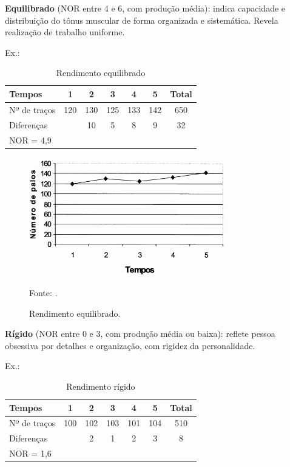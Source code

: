 \textbf{Equilibrado} (NOR entre 4 e 6, com produção média): indica capacidade e distribuição do tônus muscular de forma organizada e sistemática. Revela realização de trabalho uniforme.

Ex.:

\begin{table}[hp]
\caption{Rendimento equilibrado \cite{psicohood2018} }
\label{tab:equilibrado}

\centering
\begin{tabular}{|l|c|c|c|c|c|c|}
\hline   \multicolumn{1}{|l|}{Tempos}   & 1     & 2     & 3    &  4     & 5     & Total \\ 
\hline Nº de traços & 120 & 130 & 125 & 133 & 142 & 650 \\ 
\hline    \multicolumn{2}{|l|}{ Diferenças}& 10   & 5     & 8     & 9     & 32\\ 
\hline NOR = 4,9\\
\cline{1-11}
\end{tabular} 

\end{table}

\begin{figure}[H]
 \centering
 \includegraphics[width=0.76\textwidth]{./fig/grafico-rendimento/equilibrado}
 \caption{Rendimento equilibrado.}
  Fonte: \cite{psicohood2018}.
 \label{fig:folhas}
\end{figure}

\textbf{Rígido} (NOR entre 0 e 3, com produção média ou baixa): reflete pessoa obsessiva por detalhes e organização,
com rigidez da personalidade.

Ex.:
\begin{table}[hp]
\caption{Rendimento rígido \cite{psicohood2018} }
\label{tab:rigido} 
\centering
\begin{tabular}{|l|c|c|c|c|c|c|}
\hline Tempos       & 1     & 2     & 3    &  4     & 5     & Total \\ 
\hline Nº de traços & 100 & 102 & 103 & 101 & 104 & 510 \\ 
\hline    \multicolumn{2}{|l|}{ Diferenças}& 2   & 1     & 2     & 3     & 8\\ 
\hline NOR = 1,6 \\ \cline{1-1}
\end{tabular} 

\end{table}

